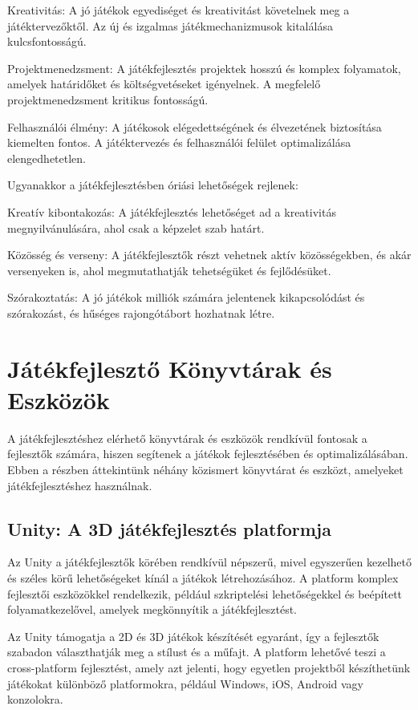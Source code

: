 Kreativitás: A jó játékok egyediséget és kreativitást követelnek meg a játéktervezőktől. Az új és izgalmas játékmechanizmusok kitalálása kulcsfontosságú.

Projektmenedzsment: A játékfejlesztés projektek hosszú és komplex folyamatok, amelyek határidőket és költségvetéseket igényelnek. A megfelelő projektmenedzsment kritikus fontosságú.

Felhasználói élmény: A játékosok elégedettségének és élvezetének biztosítása kiemelten fontos. A játéktervezés és felhasználói felület optimalizálása elengedhetetlen.

Ugyanakkor a játékfejlesztésben óriási lehetőségek rejlenek:

Kreatív kibontakozás: A játékfejlesztés lehetőséget ad a kreativitás megnyilvánulására, ahol csak a képzelet szab határt.

Közösség és verseny: A játékfejlesztők részt vehetnek aktív közösségekben, és akár versenyeken is, ahol megmutathatják tehetségüket és fejlődésüket.

Szórakoztatás: A jó játékok milliók számára jelentenek kikapcsolódást és szórakozást, és hűséges rajongótábort hozhatnak létre.


\section{Játékfejlesztő Könyvtárak és Eszközök}

A játékfejlesztéshez elérhető könyvtárak és eszközök rendkívül fontosak a fejlesztők számára, hiszen segítenek a játékok fejlesztésében és optimalizálásában. Ebben a részben áttekintünk néhány közismert könyvtárat és eszközt, amelyeket játékfejlesztéshez használnak.

\subsection{Unity: A 3D játékfejlesztés platformja}\cite{unity-doc}
Az Unity a játékfejlesztők körében rendkívül népszerű, mivel egyszerűen kezelhető és széles körű lehetőségeket kínál a játékok létrehozásához. A platform komplex fejlesztői eszközökkel rendelkezik, például szkriptelési lehetőségekkel és beépített folyamatkezelővel, amelyek megkönnyítik a játékfejlesztést.

Az Unity támogatja a 2D és 3D játékok készítését egyaránt, így a fejlesztők szabadon választhatják meg a stílust és a műfajt. A platform lehetővé teszi a cross-platform fejlesztést, amely azt jelenti, hogy egyetlen projektből készíthetünk játékokat különböző platformokra, például Windows, iOS, Android vagy konzolokra.

